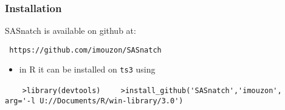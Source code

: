 \documentclass[xcolor=dvipsnames,gray,mathserif]{beamer}
\begin{document}
\begin{frame}[fragile]
   \frametitle{Installation}

   SASnatch is available on github at: \vspace{.3cm}

   \verb! https://github.com/imouzon/SASnatch! \vspace{.4cm} \\

   \begin{itemize}
      \item in R it can be installed on \verb!ts3! using 
   \end{itemize}
   \verb!    >library(devtools)!
   \verb!    >install_github('SASnatch','imouzon',!
   \verb!                    arg='-l U://Documents/R/win-library/3.0')!
   \vspace{.4cm} \\

\end{frame}
\end{document}
